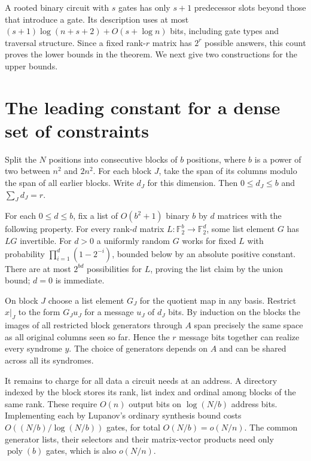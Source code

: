 \documentclass[11pt]{article}
\newcommand{\F}{\mathbb F_2}
\begin{document}
A rooted binary circuit with $s$ gates has only $s+1$ predecessor slots beyond those that introduce a gate. Its description uses at most $(s+1)\log(n+s+2)+O(s+\log n)$ bits, including gate types and traversal structure. Since a fixed rank-$r$ matrix has $2^r$ possible answers, this count proves the lower bounds in the theorem. We next give two constructions for the upper bounds.

\section{The leading constant for a dense set of constraints}
Split the $N$ positions into consecutive blocks of $b$ positions, where $b$ is a power of two between $n^2$ and $2n^2$. For each block $J$, take the span of its columns modulo the span of all earlier blocks. Write $d_J$ for this dimension. Then $0\le d_J\le b$ and $\sum_J d_J=r$.

For each $0\le d\le b$, fix a list of $O(b^2+1)$ binary $b$ by $d$ matrices with the following property. For every rank-$d$ matrix $L:\F^b\to\F^d$, some list element $G$ has $LG$ invertible. For $d>0$ a uniformly random $G$ works for fixed $L$ with probability $\prod_{i=1}^d(1-2^{-i})$, bounded below by an absolute positive constant. There are at most $2^{bd}$ possibilities for $L$, proving the list claim by the union bound; $d=0$ is immediate.

On block $J$ choose a list element $G_J$ for the quotient map in any basis. Restrict $x|_J$ to the form $G_J u_J$ for a message $u_J$ of $d_J$ bits. By induction on the blocks the images of all restricted block generators through $A$ span precisely the same space as all original columns seen so far. Hence the $r$ message bits together can realize every syndrome $y$. The choice of generators depends on $A$ and can be shared across all its syndromes.

It remains to charge for all data a circuit needs at an address. A directory indexed by the block stores its rank, list index and ordinal among blocks of the same rank. These require $O(n)$ output bits on $\log(N/b)$ address bits. Implementing each by Lupanov's ordinary synthesis bound \cite{lup} costs $O((N/b)/\log(N/b))$ gates, for total $O(N/b)=o(N/n)$. The common generator lists, their selectors and their matrix-vector products need only $\operatorname{poly}(b)$ gates, which is also $o(N/n)$.
\end{document}
